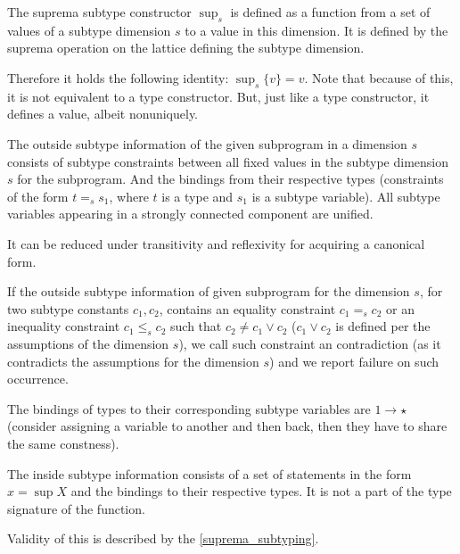 \begin{defn}
    The suprema subtype constructor $\sup_s$ is defined as a function from a set of values of a subtype dimension $s$ to a value in this dimension. It is defined by the suprema operation on the lattice defining the subtype dimension.

    Therefore it holds the following identity: $\sup_s \{v\} = v$. Note that because of this, it is not equivalent to a type constructor. But, just like a type constructor, it defines a value, albeit nonuniquely.
\end{defn}

\begin{defn}
    The outside subtype information of the given subprogram in a dimension $s$ consists of subtype constraints between all fixed values in the subtype dimension $s$ for the subprogram. And the bindings from their respective types (constraints of the form $t =_s s_1$, where $t$ is a type and $s_1$ is a subtype variable). All subtype variables appearing in a strongly connected component are unified.

    It can be reduced under transitivity and reflexivity for acquiring a canonical form.
\end{defn}

\begin{defn}
    \label{def:contra}
    If the outside subtype information of given subprogram for the dimension $s$, for two subtype constants $c_1, c_2$, contains an equality constraint $c_1 =_s c_2$ or an inequality constraint $c_1 \leq_s c_2$ such that $c_2 \neq c_1 \lor c_2$ ($c_1 \lor c_2$ is defined per the assumptions of the dimension $s$), we call such constraint an contradiction (as it contradicts the assumptions for the dimension $s$) and we report failure on such occurrence.
\end{defn}

\begin{remark}
    The bindings of types to their corresponding subtype variables are $1 \to \star$ (consider assigning a variable to another and then back, then they have to share the same constness).
\end{remark}

\begin{defn}
    The inside subtype information consists of a set of statements in the form $x = \sup X$ and the bindings to their respective types. It is not a part of the type signature of the function.

    Validity of this is described by the \cref{suprema_subtyping}.
\end{defn}

